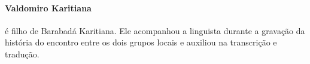  \paragraph{Valdomiro Karitiana} é filho de Barabadá Karitiana. Ele acompanhou a
 linguista durante a gravação da história do encontro entre os dois
 grupos locais e auxiliou na transcrição e tradução.


















